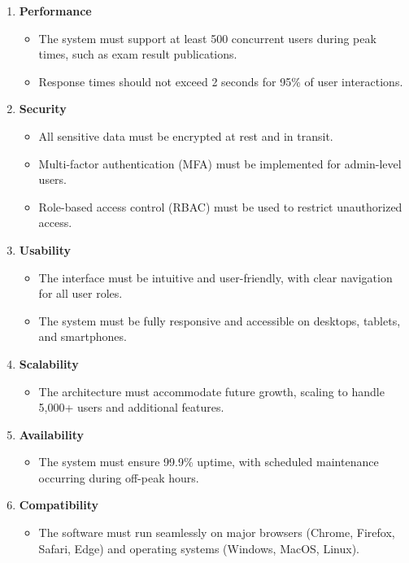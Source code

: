 \documentclass{scrreprt}
\begin{document}
\begin{enumerate}
    \item \textbf{Performance}
    \begin{itemize}
        \item The system must support at least 500 concurrent users during peak times, such as exam result publications.
        \item Response times should not exceed 2 seconds for 95\% of user interactions.
    \end{itemize}

    \item \textbf{Security}
    \begin{itemize}
        \item All sensitive data must be encrypted at rest and in transit.
        \item Multi-factor authentication (MFA) must be implemented for admin-level users.
        \item Role-based access control (RBAC) must be used to restrict unauthorized access.
    \end{itemize}

    \item \textbf{Usability}
    \begin{itemize}
        \item The interface must be intuitive and user-friendly, with clear navigation for all user roles.
        \item The system must be fully responsive and accessible on desktops, tablets, and smartphones.
    \end{itemize}

    \item \textbf{Scalability}
    \begin{itemize}
        \item The architecture must accommodate future growth, scaling to handle 5,000+ users and additional features.
    \end{itemize}

    \item \textbf{Availability}
    \begin{itemize}
        \item The system must ensure 99.9\% uptime, with scheduled maintenance occurring during off-peak hours.
    \end{itemize}

    \item \textbf{Compatibility}
    \begin{itemize}
        \item The software must run seamlessly on major browsers (Chrome, Firefox, Safari, Edge) and operating systems (Windows, MacOS, Linux).
    \end{itemize}


\end{enumerate}
\end{document}
